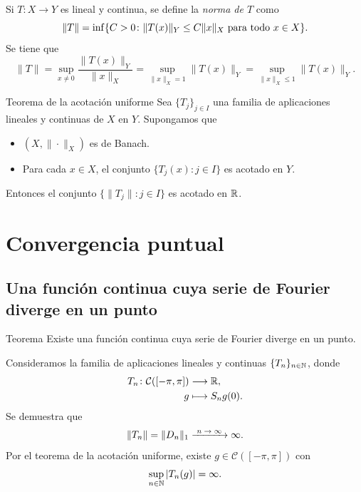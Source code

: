 \documentclass{beamer}
\begin{document}
\begin{frame}
    \begin{block}{}
        Si $T \colon X \to Y$ es lineal y continua, se define la \emph{norma de $T$} como
        \[\|T\| = \inf\{C > 0 \colon \|T(x)\|_Y \leq C\|x\|_X \textup{ para todo } x \in X\}.\]
        Se tiene que
        \[\|T\| = \sup_{x \neq 0} \frac{\|T(x)\|_Y}{\|x\|_X} = \sup_{\|x\|_X = 1} \|T(x)\|_Y = \sup_{\|x\|_X \leq 1} \|T(x)\|_Y.\]
    \end{block}
    \pause
    \begin{block}{Teorema de la acotación uniforme}
    Sea $\{T_j\}_{j \in I}$ una familia de aplicaciones lineales y continuas de $X$ en $Y$. Supongamos que
    \begin{itemize}
        \item $(X,\|\cdot\|_X)$ es de Banach.
        \item Para cada $x \in X$, el conjunto $\{T_j(x) \colon j \in I\}$ es acotado en $Y$.
    \end{itemize}
    Entonces el conjunto $\{\|T_j\| \colon j \in I\}$ es acotado en $\mathbb R$.
    \end{block}
\end{frame}

\section{Convergencia puntual}

\subsection{Una función continua cuya serie de Fourier diverge en un punto}

\begin{frame}
    \begin{block}{Teorema}
        Existe una función continua cuya serie de Fourier diverge en un punto.
    \end{block}
    \pause
    Consideramos la familia de aplicaciones lineales y continuas $\{T_n\}_{n\in\mathbb N}$, donde
    \begin{align*}
        T_n \colon \mathcal{C}([-\pi,\pi]) &\longrightarrow \mathbb R, \\
        g &\longmapsto S_ng(0).
    \end{align*} Se demuestra que
    \[\|T_n\| = \|D_n\|_1 \nconv \infty.\]
    Por el teorema de la acotación uniforme, existe $g \in \mathcal{C}([-\pi,\pi])$ con
    \[\sup_{n\in\mathbb N}|T_n(g)| = \infty.\]
\end{frame}
\end{document}
